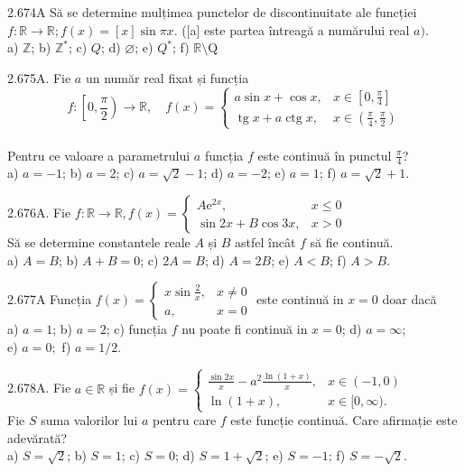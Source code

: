 \documentclass[11pt]{article}
\begin{document}
2.674A Să se determine mulțimea punctelor de discontinuitate ale funcției $f: \mathbb{R} \rightarrow \mathbb{R} ; f(x)=[x] \sin \pi x$. ([a] este partea întreagă a numărului real $a)$.\\ a) $\mathbb{Z}$; b) $\mathbb{Z}^{*}$; c) $Q$; d) $\varnothing$; e) $Q^{*}$; f) $\mathbb{R} \setminus \mathrm{Q}$

2.675A. Fie $a$ un număr real fixat și funcția $$f:\left[0, \frac{\pi}{2}\right) \rightarrow \mathbb{R}, \quad f(x)= \begin{cases}a \sin x+\cos x, & x \in\left[0, \frac{\pi}{4}\right] \\ \operatorname{tg} x+a \operatorname{ctg} x, & x \in\left(\frac{\pi}{4}, \frac{\pi}{2}\right)\end{cases}$$\\ Pentru ce valoare a parametrului $a$ funcția $f$ este continuă în punctul $\frac{\pi}{4}$?\\ a) $a=-1$; b) $a=2$; c) $a=\sqrt{2}-1$; d) $a=-2$; e) $a=1$; f) $a=\sqrt{2}+1$.

2.676A. Fie $f: \mathbb{R} \rightarrow \mathbb{R}, f(x)= \begin{cases}A \mathrm{e}^{2 x}, & x \leq 0 \\ \sin 2 x+B \cos 3 x, & x>0\end{cases}$\\Să se determine constantele reale $A$ și $B$ astfel încât $f$ să fie continuă.\\ a) $A=B$; b) $A+B=0$; c) $2 A=B$; d) $A=2 B$; e) $A<B$; f) $A>B$.

2.677A Funcția $f(x)=\left\{\begin{array}{ll}x \sin \frac{2}{x}, & x \neq 0 \\ a, & x=0\end{array}\right.$ este continuă in $x=0$ doar dacă\\ a) $a=1$; b) $a=2$; c) funcția $f$ nu poate fi continuă in $x=0$; d) $a=\infty$;\\ e) $a=0 ;$ f) $a=1 / 2$.

2.678A. Fie $a \in \mathbb{R}$ și fie $f(x)= \begin{cases}\frac{\sin 2 x}{x}-a^{2} \frac{\ln (1+x)}{x}, & x \in(-1,0) \\ \ln (1+x), & x \in[0, \infty).\end{cases}$\\Fie $S$ suma valorilor lui $a$ pentru care $f$ este funcție continuă. Care afirmație este adevărată?\\ a) $S=\sqrt{2}$; b) $S=1$; c) $S=0$; d) $S=1+\sqrt{2}$; e) $S=-1$; f) $S=-\sqrt{2}$.
\end{document}
